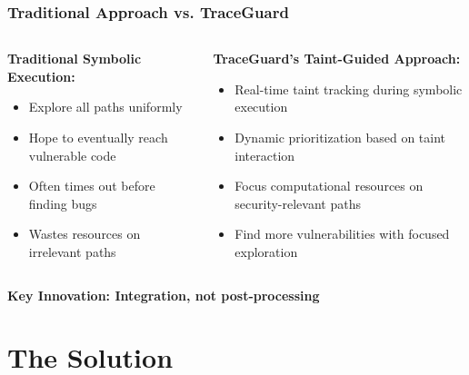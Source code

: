 \documentclass[aspectratio=169]{beamer}
\begin{document}
\begin{frame}
    \frametitle{Traditional Approach vs. TraceGuard}
    \vspace{1em}
    \begin{columns}
        \begin{column}{0.5\textwidth}
            \textbf{Traditional Symbolic Execution:}
            \begin{itemize}
                \item Explore all paths uniformly
                \item Hope to eventually reach vulnerable code
                \item Often times out before finding bugs
                \item Wastes resources on irrelevant paths
            \end{itemize}
        \end{column}
        \begin{column}{0.5\textwidth}
            \textbf{TraceGuard's Taint-Guided Approach:}
            \begin{itemize}
                \item Real-time taint tracking during symbolic execution
                \item Dynamic prioritization based on taint interaction
                \item Focus computational resources on security-relevant paths
                \item Find more vulnerabilities with focused exploration
            \end{itemize}
        \end{column}
    \end{columns}
    
    \vspace{1em}
    \begin{center}
        \large\textbf{Key Innovation: Integration, not post-processing}
    \end{center}
\end{frame}

\section{The Solution}
\end{document}
